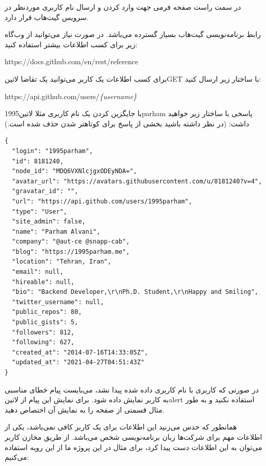 در سمت راست صفحه فرمی جهت وارد کردن و ارسال نام کاربری موردنظر در سرویس گیت‌هاب قرار دارد.

رابط برنامه‌نویسی گیت‌هاب بسیار گسترده می‌باشد. در صورت نیاز می‌توانید از وب‌گاه زیر برای کسب اطلاعات بیشتر استفاده کنید:

\begin{latin}\begin{center}
https://docs.github.com/en/rest/reference
\end{center}\end{latin}

برای کسب اطلاعات یک کاربر می‌توانید یک تقاضا ‌لاتین{GET} با ساختار زیر ارسال کنید:

\begin{latin}\begin{center}
https://api.github.com/users/\textit{\{username\}}
\end{center}\end{latin}

با جایگزین کردن یک نام کاربری مثلا ‌لاتین{1995parham} پاسخی با ساختار زیر خواهید داشت:
(در نظر داشته باشید بخشی از پاسخ برای کوتاهتر شدن حذف شده است.)

\begin{latin}
\begin{verbatim}
{
  "login": "1995parham",
  "id": 8181240,
  "node_id": "MDQ6VXNlcjgxODEyNDA=",
  "avatar_url": "https://avatars.githubusercontent.com/u/8181240?v=4",
  "gravatar_id": "",
  "url": "https://api.github.com/users/1995parham",
  "type": "User",
  "site_admin": false,
  "name": "Parham Alvani",
  "company": "@aut-ce @snapp-cab",
  "blog": "https://1995parham.me",
  "location": "Tehran, Iran",
  "email": null,
  "hireable": null,
  "bio": "Backend Developer,\r\nPh.D. Student,\r\nHappy and Smiling",
  "twitter_username": null,
  "public_repos": 80,
  "public_gists": 5,
  "followers": 812,
  "following": 627,
  "created_at": "2014-07-16T14:33:05Z",
  "updated_at": "2021-04-27T04:51:43Z"
}
\end{verbatim}
\end{latin}

در صورتی که کاربری با نام کاربری داده شده پیدا نشد، می‌بایست پیام خطای مناسبی به کاربر نمایش داده شود.
برای نمایش این پیام از ‌لاتین{alert} استفاده نکنید و به طور مثال قسمتی از صفحه را به نمایش آن اختصاص دهید.

همانطور که حدس می‌زنید این اطلاعات برای یک کاربر کافی نمی‌باشد، یکی از اطلاعات مهم برای شرکت‌ها زبان برنامه‌نویسی شخص می‌باشد.
از طریق مخازن کاربر می‌توان به این اطلاعات دست پیدا کرد، برای مثال در این پروژه ما از این رویه استفاده می‌کنیم:


